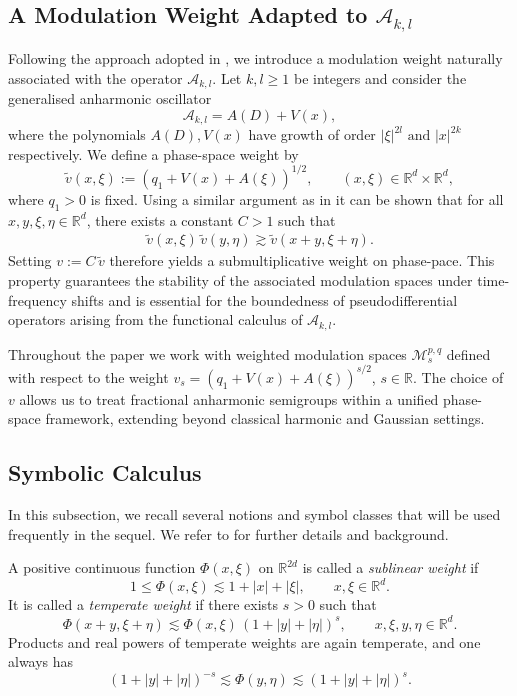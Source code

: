 \documentclass[12pt,reqno,a4paper]{amsart}
\numberwithin{equation}{section}
\theoremstyle{plain}
\theoremstyle{definition}
\theoremstyle{remark}
\def \Ad{\mathcal{A}_{k,l}}
\begin{document}
\subsection{A Modulation Weight Adapted to $\Ad$}

Following the approach adopted in \cite{MR4944933,dasgupta2026phase}, we introduce a modulation weight naturally associated with the operator \(\Ad\). Let \(k,l \geq 1\) be integers and consider the generalised anharmonic oscillator
\[
\Ad=A(D)+V(x),
\]
where the polynomials   $A(D), V(x)$ have growth of order $|\xi|^{2l} \text{ and } |x|^{2k}$ respectively.
We define a phase-space weight by
\[
\widetilde v(x,\xi)
:= (q_{1}+V(x)+A(\xi))^{1/2},
\qquad (x,\xi)\in\mathbb R^d\times\mathbb R^d,
\]
where $q_{1}>0$ is fixed. Using a similar argument as in \cite{dasgupta2026phase} it can be shown that 
for all $x,y,\xi,\eta\in\mathbb R^d$, there exists a constant $C>1$ such that
\begin{align}
\widetilde v(x,\xi)\,\widetilde v(y,\eta)
\gtrsim \widetilde v(x+y,\xi+\eta).
\label{eq:submultiplicative-weight}
\end{align}
Setting $v:=C\,\widetilde v$ therefore yields a submultiplicative weight on phase-pace.
This property guarantees the stability of the associated modulation spaces under time-frequency
shifts and is essential for the boundedness of pseudodifferential operators arising from the
functional calculus of $\mathcal{A}_{k,l}$.

Throughout the paper we work with weighted modulation spaces $ \mathcal{M}^{p,q}_{s}$ defined
with respect to the weight $v_s=(q_{1}+V(x)+A(\xi))^{s/2}$, $s\in\mathbb R$. The choice of $v$ allows us to treat
fractional anharmonic semigroups within a unified phase-space framework, extending beyond
classical harmonic and Gaussian settings.

\subsection{Symbolic Calculus}

In this subsection, we recall several notions and symbol classes that will be used frequently in the sequel. We refer to \cite{MR2668420} for further details and background.

A positive continuous function $\Phi(x,\xi)$ on $\mathbb{R}^{2d}$ is called a
\emph{sublinear weight} if
\begin{equation}
1 \le \Phi(x,\xi) \lesssim 1+|x|+|\xi|,
\qquad x,\xi\in\mathbb{R}^d.
\end{equation}
It is called a \emph{temperate weight} if there exists $s>0$ such that
\begin{equation}\label{temperate}
\Phi(x+y,\xi+\eta)
\lesssim \Phi(x,\xi)\,(1+|y|+|\eta|)^s,
\qquad x,\xi,y,\eta\in\mathbb{R}^d.
\end{equation}
Products and real powers of temperate weights are again temperate, and one always has
\[
(1+|y|+|\eta|)^{-s}
\lesssim \Phi(y,\eta)
\lesssim (1+|y|+|\eta|)^s.
\]
\end{document}
